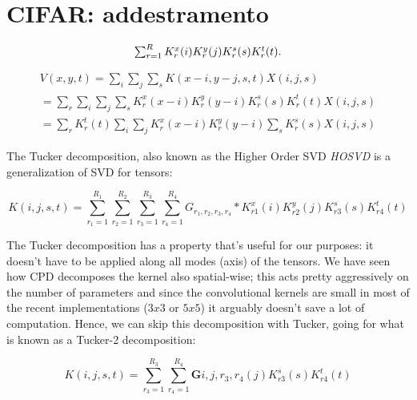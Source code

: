 \section{CIFAR: addestramento}






\begin{equation}
$$ \sum_{r=1}^R K^x_r(i)K^y_r(j)K^s_r(s)K^t_r(t) $$.	
\end{equation}


\begin{center}
\begin{align*}
	V(x, y, t) = \sum_i \sum_j \sum_s K(x-i, y-j, s, t)X(i, j, s) \\
		= \sum_r \sum_i \sum_j \sum_s K^x_r(x-i)K^y_r(y-i)K^s_r(s)K^t_r(t)X(i, j, s)\\
			= \sum_r K^t_r(t) \sum_i \sum_j K^x_r(x-i)K^y_r(y-i) \sum_s K^s_r(s) X(i, j, s) \tag{4}
\end{align*}
\end{center}


The Tucker decomposition, also known as the Higher Order SVD  \emph{HOSVD} is a generalization of SVD for tensors: 

$$ K(i, j, s, t) = \sum_{r_1=1}^{R_1}\sum_{r_2=1}^{R_2}\sum_{r_3=1}^{R_3}\sum_{r_4=1}^{R_4}G_{r_1, r_2, r_3, r_4} * K^x_{r1}(i)K^y_{r2}(j)K^s_{r3}(s)K^t_{r4}(t) $$

The Tucker decomposition has a property that's useful for our purposes: it doesn't have to be applied along all modes (axis) of the tensors. We have seen how CPD decomposes the kernel also spatial-wise; this acts
pretty aggressively on the number of parameters and since the convolutional kernels are small in most of the recent implementations ($3x3$ or $5x5$) it arguably doesn't save a lot of computation. Hence, we can skip
this decomposition with Tucker, going for what is known as a Tucker-2 decomposition: 

\begin{equation}
\label{eq:tucker-def}
	K(i, j, s, t) = \sum_{r_3=1}^{R_3}\sum_{r_4=1}^{R_4} \textbf{G} {i,j,r_3, r_4}(j)K^s_{r3}(s)K^t_{r4}(t) 
\end{equation} 

